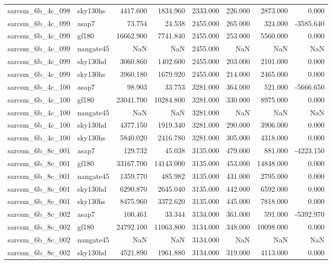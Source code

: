 \begin{tabular}{llrrrrrr}
sarcsm\_6b\_4c\_098 & sky130hs & 4417.600 & 1834.960 & 2333.000 & 226.000 & 2873.000 & 0.000 \\
sarcsm\_6b\_4c\_099 & asap7 & 73.754 & 24.538 & 2455.000 & 265.000 & 324.000 & -3585.640 \\
sarcsm\_6b\_4c\_099 & gf180 & 16662.900 & 7741.840 & 2455.000 & 253.000 & 5560.000 & 0.000 \\
sarcsm\_6b\_4c\_099 & nangate45 & NaN & NaN & 2455.000 & NaN & NaN & NaN \\
sarcsm\_6b\_4c\_099 & sky130hd & 3060.860 & 1402.600 & 2455.000 & 203.000 & 2101.000 & 0.000 \\
sarcsm\_6b\_4c\_099 & sky130hs & 3960.180 & 1679.920 & 2455.000 & 214.000 & 2465.000 & 0.000 \\
sarcsm\_6b\_4c\_100 & asap7 & 98.903 & 33.753 & 3281.000 & 364.000 & 521.000 & -5666.650 \\
sarcsm\_6b\_4c\_100 & gf180 & 23041.700 & 10284.800 & 3281.000 & 330.000 & 8975.000 & 0.000 \\
sarcsm\_6b\_4c\_100 & nangate45 & NaN & NaN & 3281.000 & NaN & NaN & NaN \\
sarcsm\_6b\_4c\_100 & sky130hd & 4377.150 & 1919.340 & 3281.000 & 290.000 & 3906.000 & 0.000 \\
sarcsm\_6b\_4c\_100 & sky130hs & 5840.020 & 2416.780 & 3281.000 & 305.000 & 4318.000 & 0.000 \\
sarcsm\_6b\_8c\_001 & asap7 & 129.732 & 45.038 & 3135.000 & 479.000 & 881.000 & -4223.150 \\
sarcsm\_6b\_8c\_001 & gf180 & 33167.700 & 14143.000 & 3135.000 & 453.000 & 14848.000 & 0.000 \\
sarcsm\_6b\_8c\_001 & nangate45 & 1359.770 & 485.982 & 3135.000 & 431.000 & 2795.000 & 0.000 \\
sarcsm\_6b\_8c\_001 & sky130hd & 6290.870 & 2645.040 & 3135.000 & 442.000 & 6592.000 & 0.000 \\
sarcsm\_6b\_8c\_001 & sky130hs & 8475.960 & 3372.620 & 3135.000 & 445.000 & 7818.000 & 0.000 \\
sarcsm\_6b\_8c\_002 & asap7 & 100.461 & 33.344 & 3134.000 & 361.000 & 591.000 & -5392.970 \\
sarcsm\_6b\_8c\_002 & gf180 & 24792.100 & 11063.800 & 3134.000 & 348.000 & 10098.000 & 0.000 \\
sarcsm\_6b\_8c\_002 & nangate45 & NaN & NaN & 3134.000 & NaN & NaN & NaN \\
sarcsm\_6b\_8c\_002 & sky130hd & 4521.890 & 1961.880 & 3134.000 & 319.000 & 4113.000 & 0.000 \\

\end{tabular}
